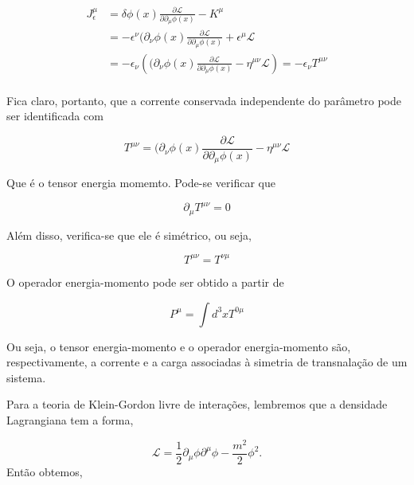 \begin{equation}
\begin{aligned}
J^\mu_\epsilon &= \delta \phi (x) \frac{\partial \mathcal{L}}{\partial \partial_\mu \phi (x)  } - K^\mu \\
&= -\epsilon^\nu (\partial_\nu \phi(x) \frac{\partial \mathcal{L}}{\partial \partial_\mu \phi (x)  } + \epsilon^\mu \mathcal{L} \\
&= -\epsilon_\nu \left( (\partial_\nu \phi(x) \frac{\partial \mathcal{L}}{\partial \partial_\mu \phi (x)  } - \eta^{\mu\nu}  \mathcal{L} \right) = -\epsilon_\nu T^{\mu\nu} \\
\end{aligned}
\end{equation}

Fica claro, portanto, que a corrente conservada independente do parâmetro pode ser identificada com

\begin{equation}
T^{\mu\nu} = (\partial_\nu \phi(x) \frac{\partial \mathcal{L}}{\partial \partial_\mu \phi (x)  } - \eta^{\mu\nu}  \mathcal{L} \label{eq:stressTensor}
\end{equation}

Que é o tensor energia momemto. Pode-se verificar que 

\begin{equation}
\partial_\mu T^{\mu\nu} = 0
\end{equation}

Além disso, verifica-se que ele é simétrico, ou seja,

\begin{equation}
T^{\mu\nu} = T^{\nu\mu}
\end{equation}

O operador energia-momento pode ser obtido a partir de 

\begin{equation}
P^\mu = \int d^3x T^{0\mu}
\end{equation}

Ou seja, o tensor energia-momento e o operador energia-momento são, respectivamente, a corrente e a carga associadas à simetria de transnalação de um sistema.

Para a teoria de Klein-Gordon livre de interações, lembremos que a densidade Lagrangiana tem a forma, 

\begin{equation}
\mathcal{L} = \frac{1}{2} \partial_\mu \phi \partial^\mu \phi - \frac{m^2}{2} \phi^2 . 
\end{equation}
Então obtemos, 

